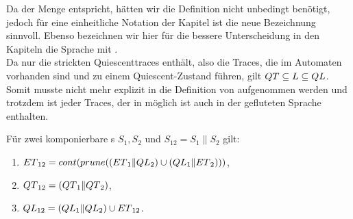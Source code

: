 Da \QT{} der Menge \StQT{} entspricht, hätten wir die Definition nicht
unbedingt benötigt, jedoch für eine einheitliche Notation der Kapitel ist die
neue Bezeichnung sinnvoll. Ebenso bezeichnen wir hier für die bessere
Unterscheidung in den Kapiteln die Sprache \EL{} mit \QL{}.\\
Da \QT{} nur die strickten Quiescenttraces enthält, also die Traces, die im
Automaten vorhanden sind und zu einem Quiescent-Zustand führen, gilt
$QT{}\subseteq L\subseteq QL{}$. Somit musste \QT{} nicht mehr explizit in die
Definition von \QL{} aufgenommen werden und trotzdem ist jeder Traces, der in
\QT{} möglich ist auch in der gefluteten Sprache enthalten.

\begin{satz}
  \label{satzQuiSemantik}
  Für zwei komponierbare \EIO{}s $S_1, S_2$ und $S_{12} = S_1\|S_2$ gilt:
  \begin{enumerate}
    \item $ET{}_{12} = cont{}(prune{}((ET{}_1\|QL{}_2)\cup (QL{}_1\|ET{}_2)))$,
    \item $QT{}_{12} = (QT{}_1\|QT{}_2)$,
    \item $QL{}_{12} = (QL{}_1\|QL{}_2)\cup ET{}_{12}$.
  \end{enumerate}
\end{satz}

